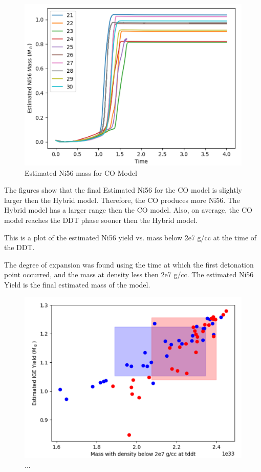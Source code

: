 \documentclass[iop,apj]{emulateapj}
\begin{document}
\begin{figure}
\includegraphics[width=\columnwidth]{figures/ni56_vs_time_CO.png}
\caption{\label{fig:nitco}
Estimated Ni56 mass for CO Model
}
\end{figure}

The figures show that the final Estimated Ni56 for the CO model is
slightly larger then the Hybrid model. Therefore, the CO produces more
Ni56. The Hybrid model has a larger range then the CO model. Also, on
average, the CO model reaches the DDT phase sooner then the Hybrid model.


This is a plot of the estimated Ni56 yield vs. mass below 2e7 g/cc at
the time of the DDT.

The degree of expansion was found using the time at which the first
detonation point occurred, and the mass at density less then 2e7 g/cc. The
estimated Ni56 Yield is the final estimated mass of the model.

\begin{figure}
\includegraphics[width=\columnwidth]{figures/ni56_yield_vs_mass_at_high_dens_v2.png}
\caption{\label{fig:masshighdens}
...
}
\end{figure}
\end{document}
